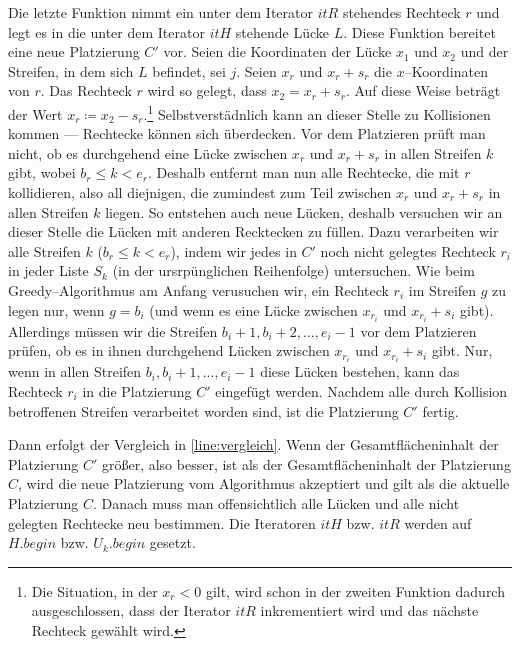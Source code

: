 Die letzte Funktion nimmt ein unter dem Iterator $itR$ stehendes Rechteck $r$
und legt es in die unter dem Iterator $itH$ stehende Lücke $L$.
Diese Funktion bereitet eine neue Platzierung $C'$ vor.
Seien die Koordinaten der Lücke $x_1$ und $x_2$ und der Streifen, in dem sich $L$ befindet, sei $j$. 
Seien $x_r$ und $x_r + s_r$ die $x$--Koordinaten von $r$.
Das Rechteck $r$ wird so gelegt, dass $x_2 = x_r + s_r$. Auf diese Weise beträgt
der Wert $x_r \coloneqq x_2 - s_r$.\footnote{Die Situation, in der $x_r < 0$ gilt, wird schon in der
zweiten Funktion dadurch ausgeschlossen, dass der Iterator $itR$ inkrementiert wird und das nächste
Rechteck gewählt wird.}
Selbstverstädnlich kann an dieser Stelle zu Kollisionen kommen --- Rechtecke können sich überdecken.
Vor dem Platzieren prüft man nicht, ob es durchgehend eine Lücke zwischen $x_r$ und $x_r + s_r$ 
in allen Streifen $k$ gibt, wobei $b_r \leqslant k < e_r$.
Deshalb entfernt man nun alle Rechtecke, die mit $r$ kollidieren, also all diejnigen, die 
zumindest zum Teil zwischen $x_r$ und $x_r + s_r$ in allen Streifen $k$ liegen.
So entstehen auch neue Lücken, deshalb versuchen wir an dieser Stelle 
die Lücken mit anderen Recktecken zu füllen.
Dazu verarbeiten wir alle Streifen $k$ ($b_r \leqslant k < e_r$), indem wir
jedes in $C'$ noch nicht gelegtes Rechteck $r_i$
in jeder Liste $S_k$ (in der ursrpünglichen Reihenfolge) untersuchen.
Wie beim Greedy--Algorithmus am Anfang verusuchen wir, ein Rechteck
$r_i$ im Streifen $g$ zu legen nur, wenn $g = b_i$
(und wenn es eine Lücke zwischen $x_{r_i}$ und $x_{r_i} + s_i$ gibt).
Allerdings müssen wir die Streifen $b_i+1, b_i+2, ..., e_i-1$ vor dem Platzieren prüfen,
ob es in ihnen durchgehend Lücken zwischen $x_{r_i}$ und $x_{r_i} + s_i$ gibt. 
Nur, wenn in allen Streifen $b_i, b_i + 1, ..., e_i-1$ diese Lücken bestehen,
kann das Rechteck $r_i$ in die Platzierung $C'$ eingefügt werden. 
Nachdem alle durch Kollision betroffenen Streifen verarbeitet worden sind,
ist die Platzierung $C'$ fertig.

Dann erfolgt der Vergleich in \cref{line:vergleich}.
Wenn der Gesamtflächeninhalt der Platzierung $C'$ größer, also besser, ist als
der Gesamtflächeninhalt der Platzierung $C$, wird die neue Platzierung vom Algorithmus
akzeptiert und gilt als die aktuelle Platzierung $C$.
Danach muss man offensichtlich alle Lücken und alle nicht gelegten Rechtecke neu bestimmen.
Die Iteratoren $itH$ bzw. $itR$ werden auf $H.begin$ bzw. $U_k.begin$ gesetzt. 
 












